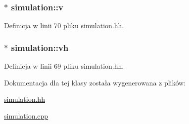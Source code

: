 \hypertarget{classsimulation_a39dbad79b1b8667840638a35e839a3f7}{
\subsubsection[{v}]{$\ast$ simulation\-::v\hspace{0.3cm}{\ttfamily [private]}}}\label{classsimulation_a39dbad79b1b8667840638a35e839a3f7}


Definicja w linii 70 pliku simulation.\-hh.

\hypertarget{classsimulation_ae6da1f15728f49be7b0793700866ede9}{
\subsubsection[{vh}]{$\ast$ simulation\-::vh\hspace{0.3cm}{\ttfamily [private]}}}\label{classsimulation_ae6da1f15728f49be7b0793700866ede9}


Definicja w linii 69 pliku simulation.\-hh.



Dokumentacja dla tej klasy została wygenerowana z plików\-:\begin{DoxyCompactItemize}
\item 
\hyperlink{simulation_8hh}{simulation.\-hh}\item 
\hyperlink{simulation_8cpp}{simulation.\-cpp}\end{DoxyCompactItemize}
